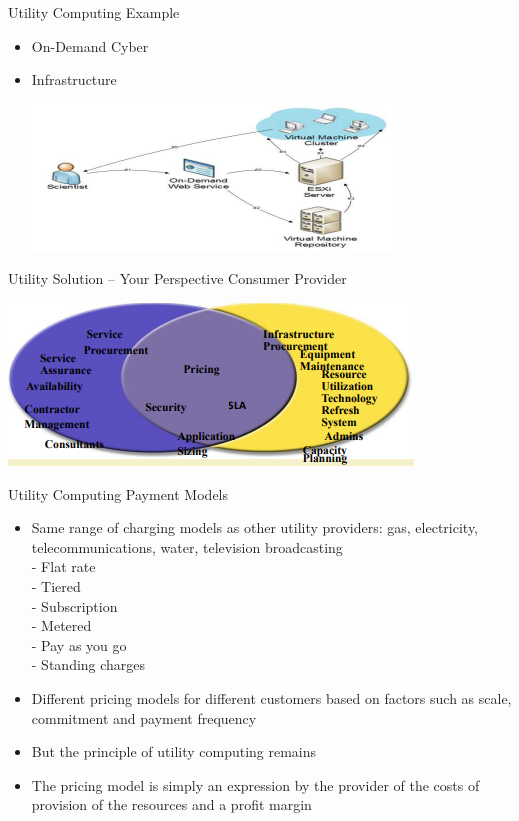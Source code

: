 \documentclass{SKP-beamer}
\begin{document}
\begin{frame}{Utility Computing Example}
	\begin{itemize}
		
		\item On-Demand Cyber
		\item Infrastructure
		
			\includegraphics[scale=1.5]{9.png}
		
		
		
	\end{itemize}
\end{frame}

\begin{frame}{Utility Solution – Your 
		Perspective Consumer Provider}
	
		
		\includegraphics[scale=1.5]{10.png}
		
		
		

\end{frame}



\begin{frame}{ Utility Computing Payment Models}
	\begin{itemize}
		
		\item   Same range of charging models as other utility providers: gas, electricity, telecommunications, water, 
		television broadcasting \\
		 - Flat rate \\
		 - Tiered \\
		 - Subscription \\
		 - Metered \\
		 - Pay as you go \\
		 - Standing charges \\
		\item Different pricing models for different customers based on factors such as scale, commitment and 
		payment frequency
		\item But the principle of utility computing remains
		\item The pricing model is simply an expression by the provider of the costs of provision of the resources and a 
		profit margin
		
	\end{itemize}
\end{frame}
\end{document}
